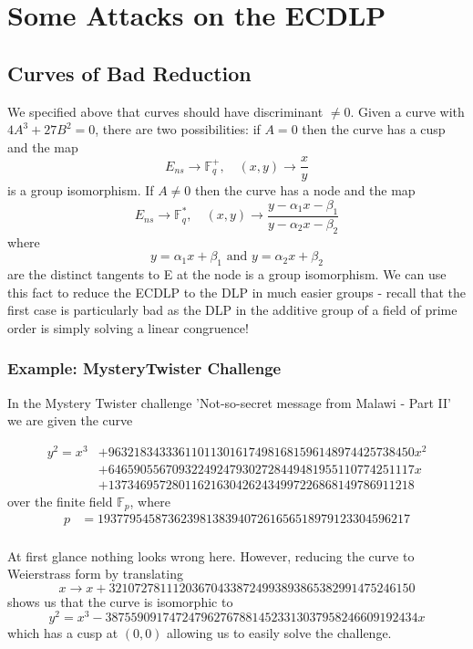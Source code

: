 \documentclass[a4paper]{article}
\begin{document}
\section{Some Attacks on the ECDLP}
\subsection{Curves of Bad Reduction}
We specified above that curves should have discriminant $\neq 0$. Given a curve with $4A^3+27B^2 = 0$, there are two possibilities: if $A=0$ then the curve has a cusp and the map $$E_{ns} \to \mathbb{F}_q^+, \quad (x, y) \to \frac{x}{y}$$ is a group isomorphism. If $A \neq 0$ then the curve has a node and the map $$E_{ns} \to \mathbb{F}_q^*, \quad (x, y) \to \frac{y - \alpha_1x - \beta_1}{y - \alpha_2 x - \beta_2}$$ where $$y = \alpha_1 x + \beta_1 \text{ and } y = \alpha_2 x + \beta_2$$ are the distinct tangents to E at the node is a group isomorphism. We can use this fact to reduce the ECDLP to the DLP in much easier groups - recall that the first case is particularly bad as the DLP in the additive group of a field of prime order is simply solving a linear congruence!

\subsubsection{Example: MysteryTwister Challenge}
In the Mystery Twister challenge 'Not-so-secret message from Malawi - Part II' we are given the curve 

\begin{align*}
y^2 = x^3 &+ 963218343336110113016174981681596148974425738450x^2 \\
&+ 646590556709322492479302728449481955110774251117x \\ &+ 137346957280116216304262434997226868149786911218
\end{align*}
over the finite field $\mathbb{F}_p$, where
\begin{align*}
p &=  1937795458736239813839407261656518979123304596217 \\
\end{align*}

At first glance nothing looks wrong here. However, reducing the curve to Weierstrass form by translating $$x \to x + 321072781112036704338724993893865382991475246150$$ shows us that the curve is isomorphic to $$y^2 = x^3 - 3875590917472479627678814523313037958246609192434 x$$ which has a cusp at $(0,0)$ allowing us to easily solve the challenge.
\end{document}
